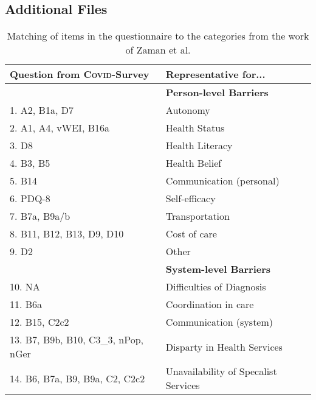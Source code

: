 \documentclass{bmcart}
\begin{document}
\begin{backmatter}
\section*{Additional Files}
\begin{table}[!ht]
\caption{Matching of items in the questionnaire to the categories from the work of Zaman et al. \cite{zaman2021barriers}}
\label{tab3:matchingzaman}
\centering
\begin{tabular}{l l}
\toprule
\textbf{Question from \textsc{Covid}-Survey}& \textbf{Representative for...} \\
\midrule
 & \textbf{Person-level Barriers} \\ \hline
1. A2, B1a, D7 & Autonomy \\ \hline
2. A1, A4, vWEI, B16a & Health Status \\ \hline
3. D8 & Health Literacy \\ \hline
4. B3, B5 & Health Belief \\ \hline
5. B14 & Communication (personal) \\ \hline
6. PDQ-8 & Self-efficacy \\ \hline
7. B7a, B9a/b & Transportation \\ \hline
8. B11, B12, B13, D9, D10 & Cost of care \\ \hline
9. D2 & Other \\ \hline
 & \textbf{System-level Barriers} \\ \hline
10. NA & Difficulties of Diagnosis \\ \hline
11. B6a & Coordination in care \\ \hline
12. B15, C2c2 & Communication (system) \\ \hline
13. B7, B9b, B10, C3\_3, nPop, nGer & Disparty in Health Services \\ \hline
14. B6, B7a, B9, B9a, C2, C2c2 & Unavailability of Specalist Services \\ \hline

\bottomrule
\end{tabular}
\end{table}


\end{backmatter}
\end{document}
